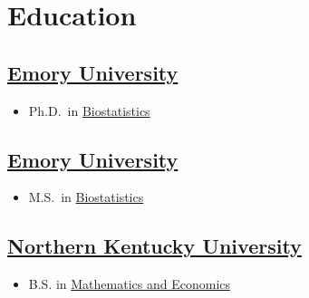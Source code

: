 \section{Education}

\subsection{\href{https://www.emory.edu/home/index.html}{Emory University}} 
\vspace{-\parskip}%
\begin{itemize}[label={}]
    \item Ph.D.\ in \href{https://www.sph.emory.edu/departments/bios/degree-programs/phd/index.html}{Biostatistics} 
\end{itemize}

\subsection{\href{https://www.emory.edu/home/index.html}{Emory University}} 
\vspace{-\parskip}%
\begin{itemize}[label={}]
  \item M.S.\ in \href{https://www.sph.emory.edu/departments/bios/degree-programs/phd/index.html}{Biostatistics} 
\end{itemize}

\subsection{\href{https://www.nku.edu}{Northern Kentucky University}}
\vspace{-\parskip}%
\begin{itemize}[label={}]
  \item B.S. in \href{https://www.nku.edu/academics/artsci/about/departments/math.html}{Mathematics and Economics}
\end{itemize}